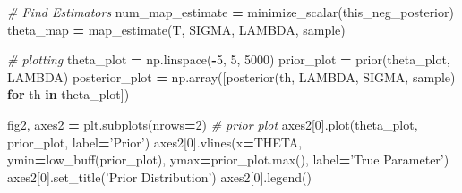 \documentclass[]{article}
\newenvironment{Shaded}{\begin{snugshade}}{\end{snugshade}}
\newcommand{\BuiltInTok}[1]{#1}
\newcommand{\CommentTok}[1]{\textcolor[rgb]{0.56,0.35,0.01}{\textit{#1}}}
\newcommand{\ControlFlowTok}[1]{\textcolor[rgb]{0.13,0.29,0.53}{\textbf{#1}}}
\newcommand{\DecValTok}[1]{\textcolor[rgb]{0.00,0.00,0.81}{#1}}
\newcommand{\KeywordTok}[1]{\textcolor[rgb]{0.13,0.29,0.53}{\textbf{#1}}}
\newcommand{\NormalTok}[1]{#1}
\newcommand{\OperatorTok}[1]{\textcolor[rgb]{0.81,0.36,0.00}{\textbf{#1}}}
\newcommand{\StringTok}[1]{\textcolor[rgb]{0.31,0.60,0.02}{#1}}
\begin{document}
\begin{Shaded}
\begin{Highlighting}[]
\CommentTok{# Find Estimators}
\NormalTok{num_map_estimate }\OperatorTok{=}\NormalTok{ minimize_scalar(this_neg_posterior)}
\NormalTok{theta_map }\OperatorTok{=}\NormalTok{ map_estimate(T, SIGMA, LAMBDA, sample)}

\CommentTok{# plotting}
\NormalTok{theta_plot }\OperatorTok{=}\NormalTok{ np.linspace(}\OperatorTok{-}\DecValTok{5}\NormalTok{, }\DecValTok{5}\NormalTok{, }\DecValTok{5000}\NormalTok{)}
\NormalTok{prior_plot }\OperatorTok{=}\NormalTok{ prior(theta_plot, LAMBDA)}
\NormalTok{posterior_plot }\OperatorTok{=}\NormalTok{ np.array([posterior(th, LAMBDA, SIGMA, sample) }\ControlFlowTok{for}\NormalTok{ th }\KeywordTok{in}\NormalTok{ theta_plot])}

\NormalTok{fig2, axes2 }\OperatorTok{=}\NormalTok{ plt.subplots(nrows}\OperatorTok{=}\DecValTok{2}\NormalTok{)}
\CommentTok{# prior plot}
\NormalTok{axes2[}\DecValTok{0}\NormalTok{].plot(theta_plot, prior_plot, label}\OperatorTok{=}\StringTok{'Prior'}\NormalTok{)}
\NormalTok{axes2[}\DecValTok{0}\NormalTok{].vlines(x}\OperatorTok{=}\NormalTok{THETA, ymin}\OperatorTok{=}\NormalTok{low_buff(prior_plot), ymax}\OperatorTok{=}\NormalTok{prior_plot.}\BuiltInTok{max}\NormalTok{(),}
\NormalTok{          label}\OperatorTok{=}\StringTok{'True Parameter'}\NormalTok{)}
\NormalTok{axes2[}\DecValTok{0}\NormalTok{].set_title(}\StringTok{'Prior Distribution'}\NormalTok{)}
\NormalTok{axes2[}\DecValTok{0}\NormalTok{].legend()}


\end{Highlighting}
\end{Shaded}
\end{document}
